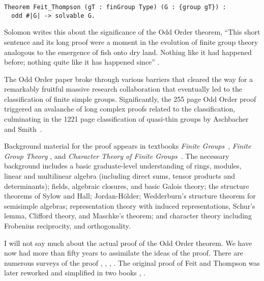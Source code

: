 \documentclass[brochure,english,12pt]{bourbaki}
\theoremstyle{plain}
\begin{document}
\begin{lstlisting}[keepspaces=true,stringstyle=\tt,basicstyle=\small,frame=single,framesep=8pt,mathescape,morekeywords={Theorem},columns=flexible]
Theorem Feit_Thompson (gT : finGroup Type) (G : {group gT}) :
  odd #|G| -> solvable G.
\end{lstlisting}

Solomon writes this about the significance of the Odd Order theorem,
``This short sentence and its long proof were a moment in the
evolution of finite group theory analogous to the emergence of fish
onto dry land.  Nothing like it had happened before; nothing quite
like it has happened since'' \cite{Sol01}.

The Odd Order paper broke through various barriers that cleared the
way for a remarkably fruitful massive research collaboration that
eventually led to the classification of finite simple groups.
Significantly, the 255 page Odd Order proof triggered an avalanche of
long complex proofs related to the classification, culminating in the
1221 page classification of quasi-thin groups by Aschbacher and
Smith~\cite{aschbacher2004classification}.


Background material for the proof appears in textbooks {\it Finite
  Groups}~\cite{gorenstein2007finite}, {\it Finite Group Theory}
\cite{aschbacher2000finite}, and {\it Character Theory of Finite
  Groups}~\cite{isaacs2013character}.  The necessary background
includes a basic graduate-level understanding of rings, modules,
linear and multilinear algebra (including direct sums, tensor products
and determinants); fields, algebraic closures, and basic Galois
theory; the structure theorems of Sylow and Hall; Jordan-H\"older;
Wedderburn's structure theorem for semisimple algebras; representation
theory with induced representations, Schur's lemma, Clifford theory,
and Maschke's theorem; and character theory including Frobenius
reciprocity, and orthogonality.

I will not say much about the actual proof of the Odd Order theorem.
We have now had more than fifty years to assimilate the ideas of the
proof.  There are numerous surveys of the proof
\cite[p. 450]{gorenstein2007finite}, \cite{glauberman1999new},
\cite{thompson1968nonsolvable}, \cite{Sol01}.  The original proof of
Feit and Thompson was later reworked and simplified in two books
\cite{bender1994local}, \cite{peterfalvi2000character}.
\end{document}
